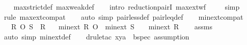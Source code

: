 \begin{isabellebody}
%
\isadelimproof
\ \ %
\endisadelimproof
%
\isatagproof
{}\isamarkupfalse%
\ max{\isacharunderscore}{\kern0pt}strict{\isacharunderscore}{\kern0pt}def\ max{\isacharunderscore}{\kern0pt}weak{\isacharunderscore}{\kern0pt}def\isanewline
\ \ \isamarkupfalse%
\ {\isacharparenleft}{\kern0pt}intro\ reduction{\isacharunderscore}{\kern0pt}pairI\ max{\isacharunderscore}{\kern0pt}ext{\isacharunderscore}{\kern0pt}wf{\isacharparenright}{\kern0pt}\isanewline
\ \ \ \isamarkupfalse%
\ simp\isanewline
\ \ \isamarkupfalse%
\ {\isacharparenleft}{\kern0pt}rule\ max{\isacharunderscore}{\kern0pt}ext{\isacharunderscore}{\kern0pt}compat{\isacharparenright}{\kern0pt}\isanewline
\ \ \isamarkupfalse%
\ {\isacharparenleft}{\kern0pt}auto\ simp{\isacharcolon}{\kern0pt}\ pair{\isacharunderscore}{\kern0pt}less{\isacharunderscore}{\kern0pt}def\ pair{\isacharunderscore}{\kern0pt}leq{\isacharunderscore}{\kern0pt}def{\isacharparenright}{\kern0pt}\isanewline
\ \ \isamarkupfalse%
%
\endisatagproof
{\isafoldproof}%
%
\isadelimproof
\isanewline
%
\endisadelimproof
\isanewline
{}\isamarkupfalse%
\ min{\isacharunderscore}{\kern0pt}ext{\isacharunderscore}{\kern0pt}compat{\isacharcolon}{\kern0pt}\isanewline
\ \ \ {\isachardoublequoteopen}R\ O\ S\ {\isasymsubseteq}\ R{\isachardoublequoteclose}\isanewline
\ \ \ {\isachardoublequoteopen}min{\isacharunderscore}{\kern0pt}ext\ R\ O\ \ {\isacharparenleft}{\kern0pt}min{\isacharunderscore}{\kern0pt}ext\ S\ {\isasymunion}\ {\isacharbraceleft}{\kern0pt}{\isacharparenleft}{\kern0pt}{\isacharbraceleft}{\kern0pt}{\isacharbraceright}{\kern0pt}{\isacharcomma}{\kern0pt}{\isacharbraceleft}{\kern0pt}{\isacharbraceright}{\kern0pt}{\isacharparenright}{\kern0pt}{\isacharbraceright}{\kern0pt}{\isacharparenright}{\kern0pt}\ {\isasymsubseteq}\ min{\isacharunderscore}{\kern0pt}ext\ R{\isachardoublequoteclose}\isanewline
%
\isadelimproof
\ \ %
\endisadelimproof
%
\isatagproof
{}\isamarkupfalse%
\ assms\isanewline
\ \ \isamarkupfalse%
\ {\isacharparenleft}{\kern0pt}auto\ simp{\isacharcolon}{\kern0pt}\ min{\isacharunderscore}{\kern0pt}ext{\isacharunderscore}{\kern0pt}def{\isacharparenright}{\kern0pt}\isanewline
\ \ \isamarkupfalse%
\ {\isacharparenleft}{\kern0pt}drule{\isacharunderscore}{\kern0pt}tac\ x{\isacharequal}{\kern0pt}ya\ \ bspec{\isacharcomma}{\kern0pt}\ assumption{\isacharparenright}{\kern0pt}\isanewline
\ \ \isamarkupfalse%

\end{isabellebody}
